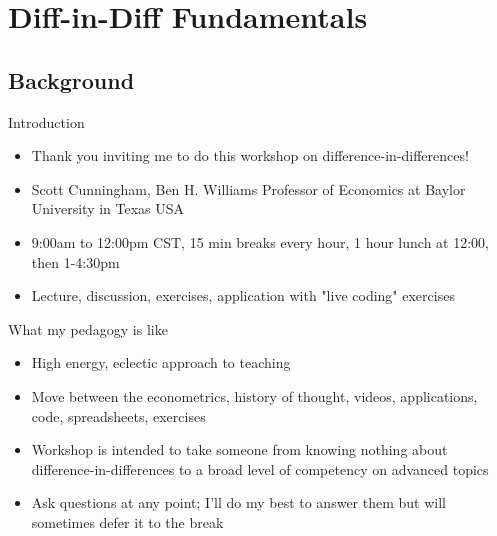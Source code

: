 \documentclass{beamer}
\begin{document}





\section{Diff-in-Diff Fundamentals}


\subsection{Background}


\begin{frame}{Introduction}

\begin{itemize}
\item Thank you inviting me to do this workshop on difference-in-differences!  
\item Scott Cunningham, Ben H. Williams Professor of Economics at Baylor University in Texas USA
\item 9:00am to 12:00pm CST, 15 min breaks every hour, 1 hour lunch at 12:00, then 1-4:30pm
\item Lecture, discussion, exercises, application with "live coding" exercises
\end{itemize}

\end{frame}


\begin{frame}{What my pedagogy is like}

\begin{itemize}
\item High energy, eclectic approach to teaching
\item Move between the econometrics, history of thought, videos, applications, code, spreadsheets, exercises
\item Workshop is intended to take someone from knowing nothing about difference-in-differences to a broad level of competency on advanced topics
\item Ask questions at any point; I'll do my best to answer them but will sometimes defer it to the break
\end{itemize}

\end{frame}
\end{document}
